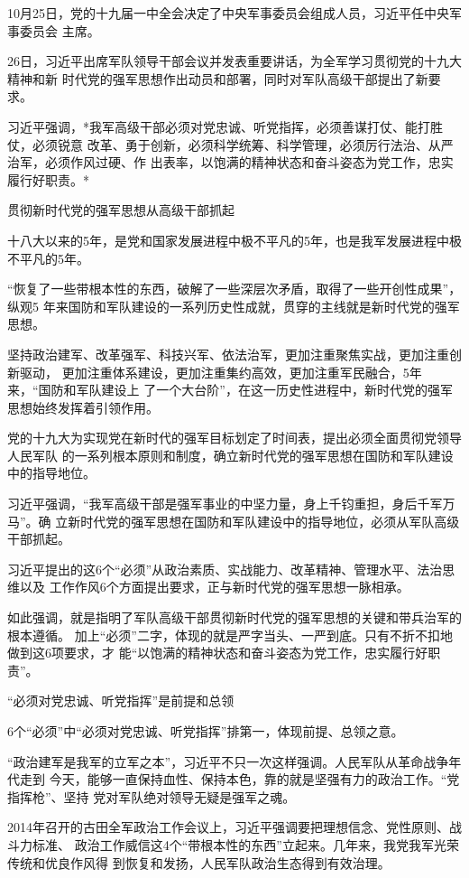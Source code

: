 \documentclass[11pt]{ctexart}
\begin{document}
{{{{10月25日，党的十九届一中全会决定了中央军事委员会组成人员，习近平任中央军事委员会
主席。

26日，习近平出席军队领导干部会议并发表重要讲话，为全军学习贯彻党的十九大精神和新
时代党的强军思想作出动员和部署，同时对军队高级干部提出了新要求。

习近平强调，*我军高级干部必须对党忠诚、听党指挥，必须善谋打仗、能打胜仗，必须锐意
改革、勇于创新，必须科学统筹、科学管理，必须厉行法治、从严治军，必须作风过硬、作
出表率，以饱满的精神状态和奋斗姿态为党工作，忠实履行好职责。*

贯彻新时代党的强军思想从高级干部抓起

十八大以来的5年，是党和国家发展进程中极不平凡的5年，也是我军发展进程中极不平凡的5年。

“恢复了一些带根本性的东西，破解了一些深层次矛盾，取得了一些开创性成果”，纵观5
年来国防和军队建设的一系列历史性成就，贯穿的主线就是新时代党的强军思想。

坚持政治建军、改革强军、科技兴军、依法治军，更加注重聚焦实战，更加注重创新驱动，
更加注重体系建设，更加注重集约高效，更加注重军民融合，5年来，“国防和军队建设上
了一个大台阶”，在这一历史性进程中，新时代党的强军思想始终发挥着引领作用。

党的十九大为实现党在新时代的强军目标划定了时间表，提出必须全面贯彻党领导人民军队
的一系列根本原则和制度，确立新时代党的强军思想在国防和军队建设中的指导地位。

习近平强调，“我军高级干部是强军事业的中坚力量，身上千钧重担，身后千军万马”。确
立新时代党的强军思想在国防和军队建设中的指导地位，必须从军队高级干部抓起。

习近平提出的这6个“必须”从政治素质、实战能力、改革精神、管理水平、法治思维以及
工作作风6个方面提出要求，正与新时代党的强军思想一脉相承。

如此强调，就是指明了军队高级干部贯彻新时代党的强军思想的关键和带兵治军的根本遵循。
加上“必须”二字，体现的就是严字当头、一严到底。只有不折不扣地做到这6项要求，才
能“以饱满的精神状态和奋斗姿态为党工作，忠实履行好职责”。

“必须对党忠诚、听党指挥”是前提和总领

6个“必须”中“必须对党忠诚、听党指挥”排第一，体现前提、总领之意。

“政治建军是我军的立军之本”，习近平不只一次这样强调。人民军队从革命战争年代走到
今天，能够一直保持血性、保持本色，靠的就是坚强有力的政治工作。“党指挥枪”、坚持
党对军队绝对领导无疑是强军之魂。

2014年召开的古田全军政治工作会议上，习近平强调要把理想信念、党性原则、战斗力标准、
政治工作威信这4个“带根本性的东西”立起来。几年来，我党我军光荣传统和优良作风得
到恢复和发扬，人民军队政治生态得到有效治理。

}}}}
\end{document}

